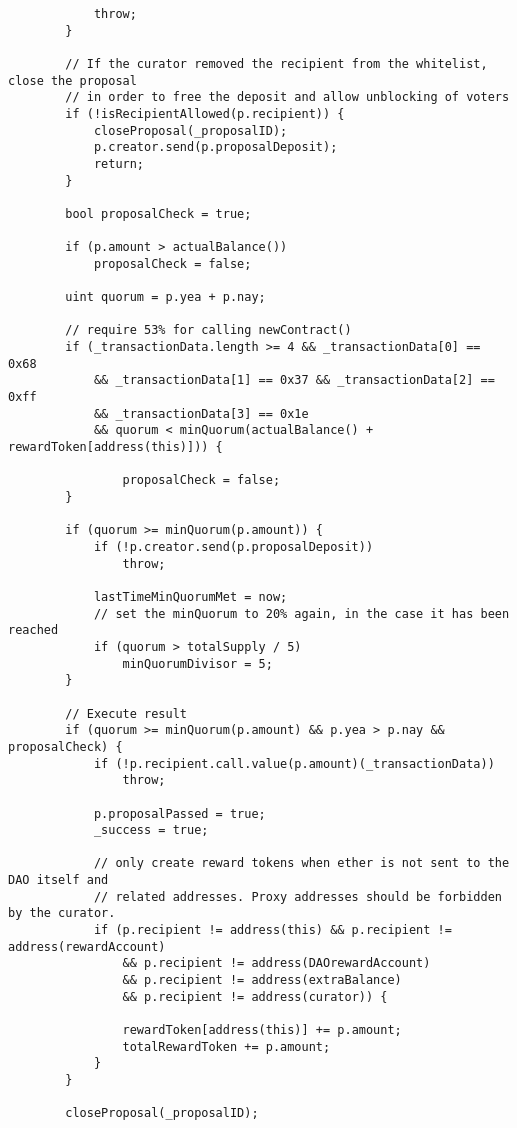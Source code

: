 \documentclass[9pt,oneside]{amsart}
\begin{document}
\begin{appendix}
\begin{verbatim}
            throw;
        }

        // If the curator removed the recipient from the whitelist, close the proposal
        // in order to free the deposit and allow unblocking of voters
        if (!isRecipientAllowed(p.recipient)) {
            closeProposal(_proposalID);
            p.creator.send(p.proposalDeposit);
            return;
        }

        bool proposalCheck = true;

        if (p.amount > actualBalance())
            proposalCheck = false;

        uint quorum = p.yea + p.nay;

        // require 53% for calling newContract()
        if (_transactionData.length >= 4 && _transactionData[0] == 0x68
            && _transactionData[1] == 0x37 && _transactionData[2] == 0xff
            && _transactionData[3] == 0x1e
            && quorum < minQuorum(actualBalance() + rewardToken[address(this)])) {

                proposalCheck = false;
        }

        if (quorum >= minQuorum(p.amount)) {
            if (!p.creator.send(p.proposalDeposit))
                throw;

            lastTimeMinQuorumMet = now;
            // set the minQuorum to 20% again, in the case it has been reached
            if (quorum > totalSupply / 5)
                minQuorumDivisor = 5;
        }

        // Execute result
        if (quorum >= minQuorum(p.amount) && p.yea > p.nay && proposalCheck) {
            if (!p.recipient.call.value(p.amount)(_transactionData))
                throw;

            p.proposalPassed = true;
            _success = true;

            // only create reward tokens when ether is not sent to the DAO itself and
            // related addresses. Proxy addresses should be forbidden by the curator.
            if (p.recipient != address(this) && p.recipient != address(rewardAccount)
                && p.recipient != address(DAOrewardAccount)
                && p.recipient != address(extraBalance)
                && p.recipient != address(curator)) {

                rewardToken[address(this)] += p.amount;
                totalRewardToken += p.amount;
            }
        }

        closeProposal(_proposalID);


\end{verbatim}
\end{appendix}
\end{document}
